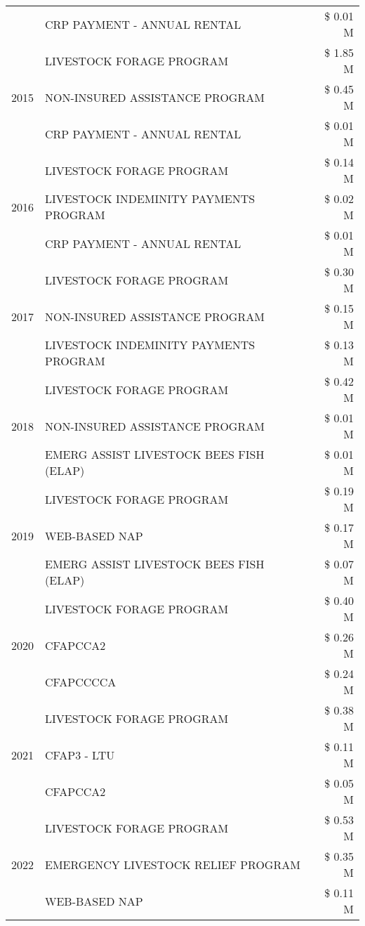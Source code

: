 \begin{tabular}{llr}
 & CRP PAYMENT - ANNUAL RENTAL & \$ 0.01 M \\
\cline{1-3}
\multirow[t]{3}{*}{2015} & LIVESTOCK FORAGE PROGRAM & \$ 1.85 M \\
 & NON-INSURED ASSISTANCE PROGRAM & \$ 0.45 M \\
 & CRP PAYMENT - ANNUAL RENTAL & \$ 0.01 M \\
\cline{1-3}
\multirow[t]{3}{*}{2016} & LIVESTOCK FORAGE PROGRAM & \$ 0.14 M \\
 & LIVESTOCK INDEMINITY PAYMENTS PROGRAM & \$ 0.02 M \\
 & CRP PAYMENT - ANNUAL RENTAL & \$ 0.01 M \\
\cline{1-3}
\multirow[t]{3}{*}{2017} & LIVESTOCK FORAGE PROGRAM & \$ 0.30 M \\
 & NON-INSURED ASSISTANCE PROGRAM & \$ 0.15 M \\
 & LIVESTOCK INDEMINITY PAYMENTS PROGRAM & \$ 0.13 M \\
\cline{1-3}
\multirow[t]{3}{*}{2018} & LIVESTOCK FORAGE PROGRAM & \$ 0.42 M \\
 & NON-INSURED ASSISTANCE PROGRAM & \$ 0.01 M \\
 & EMERG ASSIST LIVESTOCK BEES FISH (ELAP) & \$ 0.01 M \\
\cline{1-3}
\multirow[t]{3}{*}{2019} & LIVESTOCK FORAGE PROGRAM & \$ 0.19 M \\
 & WEB-BASED NAP & \$ 0.17 M \\
 & EMERG ASSIST LIVESTOCK BEES FISH (ELAP) & \$ 0.07 M \\
\cline{1-3}
\multirow[t]{3}{*}{2020} & LIVESTOCK FORAGE PROGRAM & \$ 0.40 M \\
 & CFAPCCA2 & \$ 0.26 M \\
 & CFAPCCCCA & \$ 0.24 M \\
\cline{1-3}
\multirow[t]{3}{*}{2021} & LIVESTOCK FORAGE PROGRAM & \$ 0.38 M \\
 & CFAP3 - LTU & \$ 0.11 M \\
 & CFAPCCA2 & \$ 0.05 M \\
\cline{1-3}
\multirow[t]{3}{*}{2022} & LIVESTOCK FORAGE PROGRAM & \$ 0.53 M \\
 & EMERGENCY LIVESTOCK RELIEF PROGRAM & \$ 0.35 M \\
 & WEB-BASED NAP & \$ 0.11 M \\
\cline{1-3}
\bottomrule
\end{tabular}
